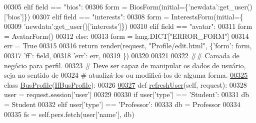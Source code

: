 \begin{DoxyCode}
00305                 \textcolor{keywordflow}{elif} field == \textcolor{stringliteral}{"bios"}:
00306                     form = BiosForm(initial=\{\textcolor{stringliteral}{'newdata'}:get\_user()[\textcolor{stringliteral}{'bios'}]\})
00307                 \textcolor{keywordflow}{elif} field == \textcolor{stringliteral}{"interests"}:
00308                     form = InterestsForm(initial=\{
00309                             \textcolor{stringliteral}{'newdata'}:get\_user()[\textcolor{stringliteral}{'interests'}]\})
00310                 \textcolor{keywordflow}{elif} field == \textcolor{stringliteral}{"avatar"}:
00311                     form = AvatarForm()
00312                 \textcolor{keywordflow}{else}:
00313                     form = lang.DICT[\textcolor{stringliteral}{"ERROR\_FORM"}]
00314                     err = \textcolor{keyword}{True} 
00315 
00316                 \textcolor{keywordflow}{return} render(request, \textcolor{stringliteral}{"Profile/edit.html"}, \{\textcolor{stringliteral}{'form'}: form,
00317                                                              \textcolor{stringliteral}{'ff'}: field,
00318                                                              \textcolor{stringliteral}{'err'}: err,
00319                                                             \})
00320         
00321 
00322 \textcolor{comment}{## Camada de negócio para perfil.}
00323 \textcolor{comment}{#   Deve ser capaz de manipular os dados de usuário, seja no sentido de }
00324 \textcolor{comment}{#   atualizá-los ou modificá-los de alguma forma.}
\hypertarget{ProfileUnit_8py_source_l00325}{}\hyperlink{classProfile_1_1ProfileUnit_1_1BusProfile}{00325} \textcolor{keyword}{class }\hyperlink{classProfile_1_1ProfileUnit_1_1BusProfile}{BusProfile}(\hyperlink{classProfile_1_1ProfileUnit_1_1IfBusProfile}{IfBusProfile}):
00326 
\hypertarget{ProfileUnit_8py_source_l00327}{}\hyperlink{classProfile_1_1ProfileUnit_1_1BusProfile_ace81426164b30cfa2871e6093052934d}{00327}     \textcolor{keyword}{def }\hyperlink{classProfile_1_1ProfileUnit_1_1BusProfile_ace81426164b30cfa2871e6093052934d}{refreshUser}(self, request):
00328         user = request.session[\textcolor{stringliteral}{'user'}]
00329 
00330         \textcolor{keywordflow}{if} user[\textcolor{stringliteral}{'type'}] == \textcolor{stringliteral}{'Student'}:
00331             db = Student
00332         \textcolor{keywordflow}{elif} user[\textcolor{stringliteral}{'type'}] == \textcolor{stringliteral}{'Professor'}:
00333             db = Professor
00334 
00335         fs = self.pers.fetch(user[\textcolor{stringliteral}{'name'}], db)

\end{DoxyCode}
